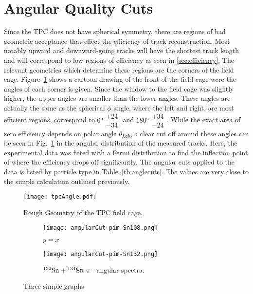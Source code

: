 \section{Angular Quality Cuts}

Since the TPC does not have spherical symmetry, there are regions of bad geometric acceptance that effect the efficiency of track reconstruction. Most notably upward and downward-going tracks will have the shortest track length and will correspond to low regions of efficiency as seen in \ref{sec:efficiency}. The relevant geometries which determine these regions are the corners of the field cage. Figure~\ref{fig:angleEffExplanation} shows a cartoon drawing of the front of the field cage were the angles of each corner is given. Since the window to the field cage was slightly higher, the upper angles are smaller than the lower angles. These angles are actually the same as the spherical $\phi$ angle, where the left and right, are most efficient regions, correspond to  $\ang{0}\substack{+24 \\ -34}$ and $\ang{180}\substack{+34 \\ -24}$.  While the exact area of zero efficiency depends on polar angle $\theta_{Lab}$, a clear cut off around these angles can be seen in Fig.~\ref{fig:angleEffExplanation} in the angular distribution of the measured tracks. Here, the experimental data was fitted with a Fermi distribution to find the inflection point of where the efficiency drops off significantly. The angular cuts applied to the data is listed by particle type in Table~\ref{tb:anglecuts}. The values are very close to the simple calculation outlined previously. 


\begin{figure}[!htb]
\centering
\texttt{[image: tpcAngle.pdf]}
\caption{Rough Geometry of the TPC field cage.}
\label{fig:angleEffExplanation}
\end{figure}


\begin{figure}[!htb]
     \centering
     \begin{subfigure}[b]{0.49\textwidth}
         \centering
         \texttt{[image: angularCut-pim-Sn108.png]}
         \caption{$y=x$}
         \label{fig:pim108angle}
     \end{subfigure}
     \hfill
     \begin{subfigure}[b]{0.49\textwidth}
         \centering
         \texttt{[image: angularCut-pim-Sn132.png]}
         \caption{${}^{132}\mathrm{Sn} + {}^{124}\mathrm{Sn}$ $\pi^-$ angular spectra.}
         \label{fig:pim132angle}
     \end{subfigure}
        \caption{Three simple graphs}
        \label{fig:pim}
\end{figure}



